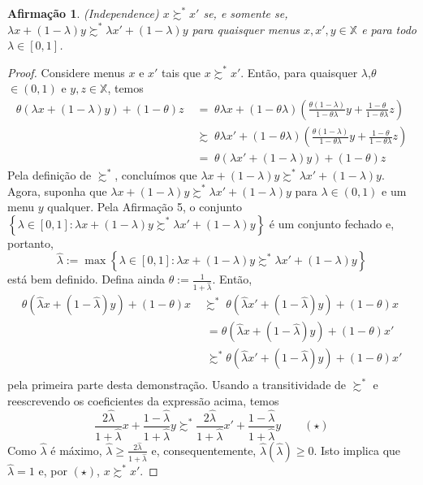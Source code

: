 \documentclass[11pt, a4paper]{article}
\theoremstyle{nonumberplain}
\newtheorem{proof}{Dem.}
\theoremstyle{plain}
\newtheorem{claim}{Afirmação}
\theoremstyle{plain}
\begin{document}
\begin{claim} (\textit{Independence}) $x\succsim^*x'$ se, e somente se, $\lambda x + (1-\lambda)y\succsim^* \lambda x' + (1-\lambda)y$ para quaisquer menus $x,x',y\in \mathbb{X}$ e para todo $\lambda \in [0,1]$.\end{claim}
\begin{proof}
Considere menus $x$ e $x'$ tais que $x\succsim^* x'$. Então, para quaisquer $\lambda$,$\theta$ $\in (0,1)$ e $y,z\in\mathbb{X}$, temos
\begin{align*}
\theta(\lambda x + (1-\lambda)y)+(1-\theta)z \;&=\; \theta\lambda x + (1-\theta\lambda)\left(\frac{\theta(1-\lambda)}{1-\theta\lambda}y+\frac{1-\theta}{1-\theta\lambda}z\right)\\
&\succsim\;  \theta\lambda x' + (1-\theta\lambda)\left(\frac{\theta(1-\lambda)}{1-\theta\lambda}y+\frac{1-\theta}{1-\theta\lambda}z\right)\\
&=\; \theta(\lambda x' + (1-\lambda)y)+(1-\theta)z
\end{align*}
Pela definição de $\succsim^*$, concluímos que $\lambda x + (1-\lambda)y\succsim^*\lambda x' + (1-\lambda)y$. 
Agora, suponha que $\lambda x + (1-\lambda)y\succsim^*\lambda x' + (1-\lambda)y$ para $\lambda\in(0,1)$ e um menu $y$ qualquer. Pela Afirmação 5, o conjunto $\left\{\lambda\in[0,1]:\lambda x + (1-\lambda)y\succsim^*\lambda x' + (1-\lambda)y\right\}$ é um conjunto fechado e, portanto, $$\hat{\lambda}:=\max\left\{\lambda\in[0,1]:\lambda x + (1-\lambda)y\succsim^*\lambda x' + (1-\lambda)y\right\}$$ está bem definido. Defina ainda $\theta:=\frac{1}{1+\hat{\lambda}}$. Então,
\begin{align*}
\theta(\hat{\lambda}x+(1-\hat{\lambda})y)+(1-\theta)x\;&\succsim^*\;\theta(\hat{\lambda}x'+(1-\hat{\lambda})y)+(1-\theta)x\\
&\;= \theta(\hat{\lambda}x+(1-\hat{\lambda})y)+(1-\theta)x'\\
&\;\succsim^* \theta(\hat{\lambda}x'+(1-\hat{\lambda})y)+(1-\theta)x'\\  
\end{align*} pela primeira parte desta demonstração. Usando a transitividade de $\succsim^*$ e reescrevendo os coeficientes da expressão acima, temos $$\frac{2\hat{\lambda}}{1+\hat{\lambda}}x+\frac{1-\hat{\lambda}}{1+\hat{\lambda}}y \succsim^* \frac{2\hat{\lambda}}{1+\hat{\lambda}}x'+\frac{1-\hat{\lambda}}{1+\hat{\lambda}}y \qquad (\star)$$ Como $\hat{\lambda}$ é máximo, $\hat{\lambda}\geq \frac{2\hat{\lambda}}{1+\hat{\lambda}}$ e, consequentemente, $\hat{\lambda}(\hat{\lambda})\geq 0$. Isto implica que $\hat{\lambda}=1$ e, por $(\star)$, $x\succsim^* x'$.
\end{proof}
\end{document}
